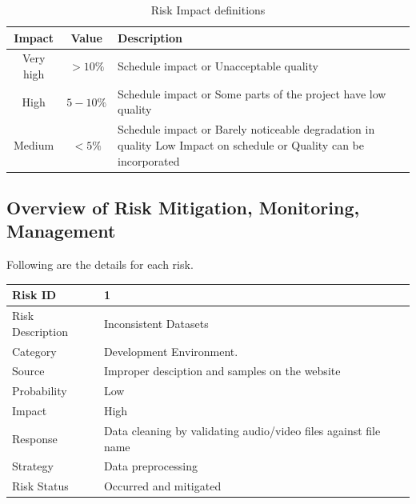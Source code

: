 \documentclass[oneside,a4paper,12pt]{report}
\begin{document}
\begin{normalsize}
\begin{table}[!htbp]
	\begin{center}
		\def\arraystretch{1.5}
		\begin{tabularx}{\textwidth}{| c | c | X |}
			\hline
			Impact & Value	& Description \\ \hline
			Very high &	$> 10 \%$ & Schedule impact or Unacceptable quality \\ \hline
			High &	$5-10 \%$ & Schedule impact or Some parts of the project have low quality \\ \hline
			Medium	& $ < 5 \% $ & Schedule impact or Barely noticeable degradation in quality Low	Impact on schedule or Quality can be incorporated \\ \hline
		\end{tabularx}
	\end{center}
	\caption{Risk Impact definitions}
	\label{tab:riskImpactDef}
\end{table}

\vspace{10mm}
\subsection{Overview of Risk Mitigation, Monitoring, Management}

Following are the details for each risk.
\begin{table}[!htbp]
	\begin{center}
		\def\arraystretch{1.5}
		\begin{tabularx}{\textwidth}{| l | X |}
			\hline 
			Risk ID	& 1 \\ \hline
			Risk Description	& Inconsistent Datasets \\ \hline
			Category	& Development Environment. \\ \hline
			Source	&  Improper desciption and samples on the website\\ \hline
			Probability	& Low \\ \hline
			Impact	& High \\ \hline
			Response	& Data cleaning by validating audio/video files against file name \\ \hline
			Strategy	& Data preprocessing \\ \hline
			Risk Status	& Occurred and mitigated \\ \hline
		\end{tabularx}
	\end{center}
	\label{tab:risk1}
\end{table}


\end{normalsize}
\end{document}
